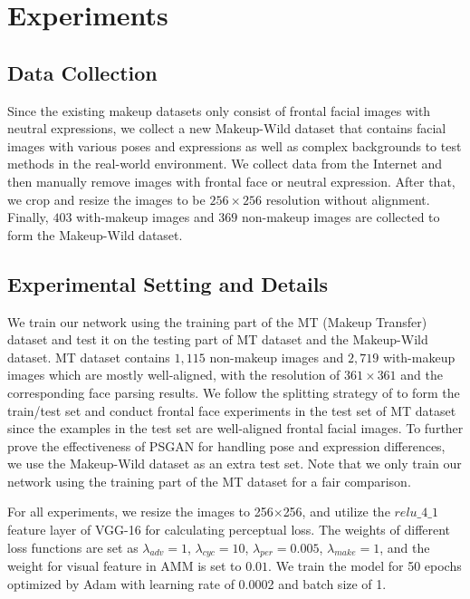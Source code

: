 \section{Experiments}

\subsection{Data Collection}
Since the existing makeup datasets only consist of frontal facial images with neutral expressions, we collect a new Makeup-Wild dataset that contains facial images with various poses and expressions as well as complex backgrounds to test methods in the real-world environment. We collect data from the Internet and then manually remove images with frontal face or neutral expression. After that, we crop and resize the images to be $256 \times 256$ resolution without alignment.
Finally, $403$ with-makeup images and $369$ non-makeup images are collected to form the Makeup-Wild dataset.

\subsection{Experimental Setting and Details}
We train our network using the training part of the MT (Makeup Transfer) dataset \cite{Li2018BeautyGANIF,ChenBeautyGlow2019} and test it on the testing part of MT dataset and the Makeup-Wild dataset. MT dataset contains $1,115$ non-makeup images and $2,719$ with-makeup images which are mostly well-aligned, with the resolution of $361 \times 361$ and the corresponding face parsing results. We follow the splitting strategy of \cite{Li2018BeautyGANIF} to form the train/test set and conduct frontal face experiments in the test set of MT dataset since the examples in the test set are well-aligned frontal facial images. 
To further prove the effectiveness of PSGAN for handling pose and expression differences, we use the Makeup-Wild dataset as an extra test set. Note that we only train our network using the training part of the MT dataset for a fair comparison.

For all experiments, we resize the images to 256$\times$256, and utilize the $relu\_4\_1$ feature layer of VGG-16 for calculating perceptual loss. The weights of different loss functions are set as $\lambda_{adv} = 1$, $\lambda_{cyc} = 10$, $\lambda_{per} = 0.005$, $\lambda_{make} = 1$, and the weight for visual feature in AMM is set to $0.01$. We train the model for 50 epochs optimized by Adam \cite{kingma2014adam} with learning rate of 0.0002 and batch size of 1.

